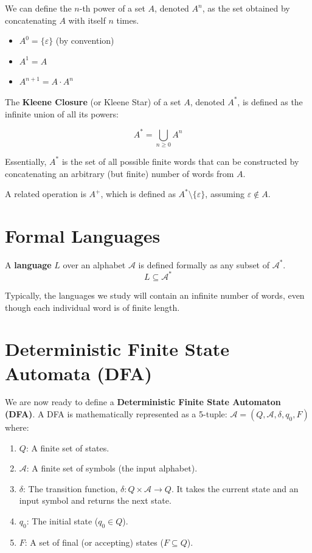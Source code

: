 We can define the $n$-th power of a set $A$, denoted $A^n$, as the set obtained by concatenating $A$ with itself $n$ times.
\begin{itemize}
\item $A^0 = \{\varepsilon\}$ (by convention)
\item $A^1 = A$
\item $A^{n+1} = A \cdot A^n$
\end{itemize}

The \textbf{Kleene Closure} (or Kleene Star) of a set $A$, denoted $A^*$, is defined as the infinite union of all its powers:

$$ A^* = \bigcup_{n \ge 0} A^n $$

Essentially, $A^*$ is the set of all possible finite words that can be constructed by concatenating an arbitrary (but finite) number of words from $A$. 

\begin{note}
A related operation is $A^+$, which is defined as $A^* \setminus \{\varepsilon\}$, assuming $\varepsilon \notin A$.
\end{note}

\section{Formal Languages}

A \textbf{language} $L$ over an alphabet $\mathcal{A}$ is defined formally as any subset of $\mathcal{A}^*$.
$$ L \subseteq \mathcal{A}^* $$

Typically, the languages we study will contain an infinite number of words, even though each individual word is of finite length.

\section{Deterministic Finite State Automata (DFA)}

We are now ready to define a \textbf{Deterministic Finite State Automaton (DFA)}. 
A DFA is mathematically represented as a 5-tuple: $\mathcal{A} = (Q, \mathcal{A}, \delta, q_0, F)$
where:
\begin{enumerate}
\item $Q$: A finite set of states.
\item $\mathcal{A}$: A finite set of symbols (the input alphabet).
\item $\delta$: The transition function, $\delta: Q \times \mathcal{A} \rightarrow Q$. It takes the current state and an input symbol and returns the next state.
\item $q_0$: The initial state ($q_0 \in Q$).
\item $F$: A set of final (or accepting) states ($F \subseteq Q$).
\end{enumerate}

